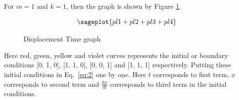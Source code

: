 For $m=1$ and $k=1$, then the graph is shown by Figure 
\ref{fig:Displacement Time graph1}.
\begin{figure}[h!]
$$\sageplot{pl1+pl2+pl3+pl4}$$
\caption{Displacement Time graph}
\label{fig:Displacement Time graph1}
\end{figure}
Here red, green, yellow and violet curves represents the initial or boundary 
conditions [0, 1, 0], [1, 1, 0], [0, 0, 1] and [1, 1, 1] respectively. Putting 
these initial conditions in Eq.~\ref{eq:2} one by one. Here $t$ corresponds to first 
term, $x$ corresponds to second term and $\frac{\mathrm{d}x}{\mathrm{d}t}$ 
corresponds to third term in the initial conditions.
